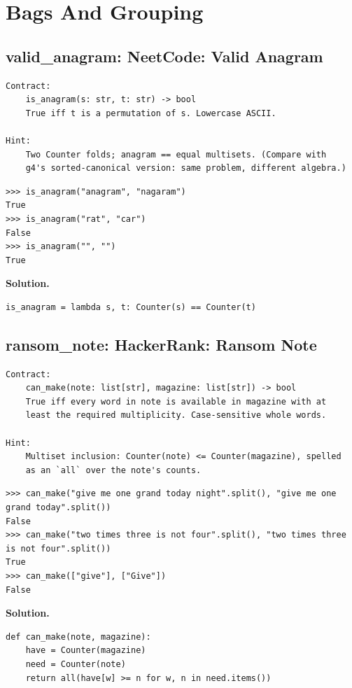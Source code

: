 \documentclass[10pt,letterpaper]{book}
\begin{document}
\chapter{Bags And Grouping}

\section{valid\_anagram: NeetCode: Valid Anagram}
\begin{lstlisting}[style=ex]
Contract:
    is_anagram(s: str, t: str) -> bool
    True iff t is a permutation of s. Lowercase ASCII.

Hint:
    Two Counter folds; anagram == equal multisets. (Compare with
    g4's sorted-canonical version: same problem, different algebra.)
\end{lstlisting}
\begin{lstlisting}[style=ex]
>>> is_anagram("anagram", "nagaram")
True
>>> is_anagram("rat", "car")
False
>>> is_anagram("", "")
True
\end{lstlisting}
\noindent\textbf{Solution.}
\begin{lstlisting}[style=code]
is_anagram = lambda s, t: Counter(s) == Counter(t)
\end{lstlisting}

\section{ransom\_note: HackerRank: Ransom Note}
\begin{lstlisting}[style=ex]
Contract:
    can_make(note: list[str], magazine: list[str]) -> bool
    True iff every word in note is available in magazine with at
    least the required multiplicity. Case-sensitive whole words.

Hint:
    Multiset inclusion: Counter(note) <= Counter(magazine), spelled
    as an `all` over the note's counts.
\end{lstlisting}
\begin{lstlisting}[style=ex]
>>> can_make("give me one grand today night".split(), "give me one grand today".split())
False
>>> can_make("two times three is not four".split(), "two times three is not four".split())
True
>>> can_make(["give"], ["Give"])
False
\end{lstlisting}
\noindent\textbf{Solution.}
\begin{lstlisting}[style=code]
def can_make(note, magazine):
    have = Counter(magazine)
    need = Counter(note)
    return all(have[w] >= n for w, n in need.items())
\end{lstlisting}
\end{document}
